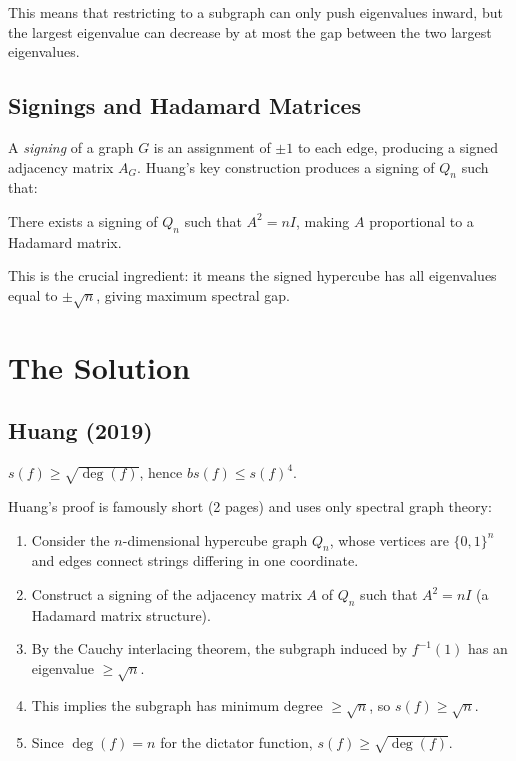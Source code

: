This means that restricting to a subgraph can only push eigenvalues inward, but the largest eigenvalue can decrease by at most the gap between the two largest eigenvalues.

\subsection{Signings and Hadamard Matrices}

A \emph{signing} of a graph $G$ is an assignment of $\pm 1$ to each edge, producing a signed adjacency matrix $A_G$. Huang's key construction produces a signing of $Q_n$ such that:

\begin{fact}
There exists a signing of $Q_n$ such that $A^2 = nI$, making $A$ proportional to a Hadamard matrix.
\end{fact}

This is the crucial ingredient: it means the signed hypercube has all eigenvalues equal to $\pm\sqrt{n}$, giving maximum spectral gap.

\section{The Solution}

\subsection{Huang (2019)}

\begin{theorem}
$s(f) \ge \sqrt{\deg(f)}$, hence $bs(f) \le s(f)^4$.
\end{theorem}

Huang's proof is famously short (2 pages) and uses only spectral graph theory:

\begin{enumerate}
\item Consider the $n$-dimensional hypercube graph $Q_n$, whose vertices are $\{0,1\}^n$ and edges connect strings differing in one coordinate.
\item Construct a signing of the adjacency matrix $A$ of $Q_n$ such that $A^2 = nI$ (a Hadamard matrix structure).
\item By the Cauchy interlacing theorem, the subgraph induced by $f^{-1}(1)$ has an eigenvalue $\ge \sqrt{n}$.
\item This implies the subgraph has minimum degree $\ge \sqrt{n}$, so $s(f) \ge \sqrt{n}$.
\item Since $\deg(f) = n$ for the dictator function, $s(f) \ge \sqrt{\deg(f)}$.
\end{enumerate}

